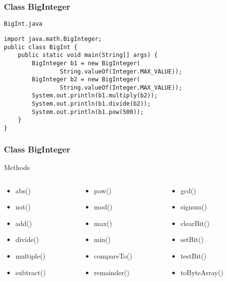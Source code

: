 \documentclass[10pt, compress]{beamer}
\begin{document}
\begin{frame}[fragile]
\frametitle{Class BigInteger}
	\begin{block}{\texttt{BigInt.java}}
		\begin{verbatim}
import java.math.BigInteger;
public class BigInt {
	public static void main(String[] args) {
		BigInteger b1 = new BigInteger(
				String.valueOf(Integer.MAX_VALUE));
		BigInteger b2 = new BigInteger(
				String.valueOf(Integer.MAX_VALUE));
		System.out.println(b1.multiply(b2));
		System.out.println(b1.divide(b2));
		System.out.println(b1.pow(500));
	}
}
		\end{verbatim}
	\end{block}
\end{frame}

\begin{frame}[fragile]
\frametitle{Class BigInteger}
	\begin{block}{Methods}
		\begin{columns}
			\begin{column}{0.3\textwidth}
				\begin{itemize}
					\item[] abs()
					\item[] not()
					\item[] add()
					\item[] divide()
					\item[] multiple()
					\item[] subtract()
				\end{itemize}
			\end{column}
			\begin{column}{0.3\textwidth}
				\begin{itemize}
					\item[] pow()
					\item[] mod()
					\item[] max()
					\item[] min()
					\item[] compareTo()
					\item[] remainder()
				\end{itemize}
			\end{column}
			\begin{column}{0.3\textwidth}
				\begin{itemize}
					\item[] gcd()
					\item[] signum()
					\item[] clearBit()
					\item[] setBit()
					\item[] testBit()
					\item[] toByteArray()
				\end{itemize}
			\end{column}
		\end{columns}
	\end{block}
\end{frame}
\end{document}
